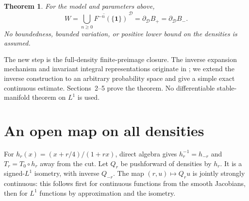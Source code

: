 \documentclass[11pt]{article}
\newtheorem{theorem}{Theorem}
\newcommand{\D}{\mathcal D}
\newcommand{\one}{\mathbf 1}
\begin{document}
\begin{theorem}\label{thm:main}
For the model and parameters above,
\[
 W=\overline{\bigcup_{n\ge0}F^{-n}(\{\one\})}^{\,\D}
   =\partial_\D B_+=\partial_\D B_-.
\]
No boundedness, bounded variation, or positive lower bound on the densities
is assumed.
\end{theorem}

The new step is the full-density finite-preimage closure. The inverse
expansion mechanism and invariant integral representations originate in
\cite[Sections~3--4]{BKZ}; we extend the inverse construction to an arbitrary
probability space and give a simple exact continuous estimate. Sections~2--5
prove the theorem. No differentiable stable-manifold theorem on $L^1$ is used.

\section{An open map on all densities}
For $h_r(x)=(x+r/4)/(1+rx)$, direct algebra gives
$h_r^{-1}=h_{-r}$ and $T_r=T_0\circ h_r$ away from the cut. Let $Q_r$ be
pushforward of densities by $h_r$. It is a signed-$L^1$ isometry, with inverse
$Q_{-r}$. The map $(r,u)\mapsto Q_ru$ is jointly strongly continuous:
this follows first for continuous functions from the smooth Jacobians, then
for $L^1$ functions by approximation and the isometry.
\end{document}
